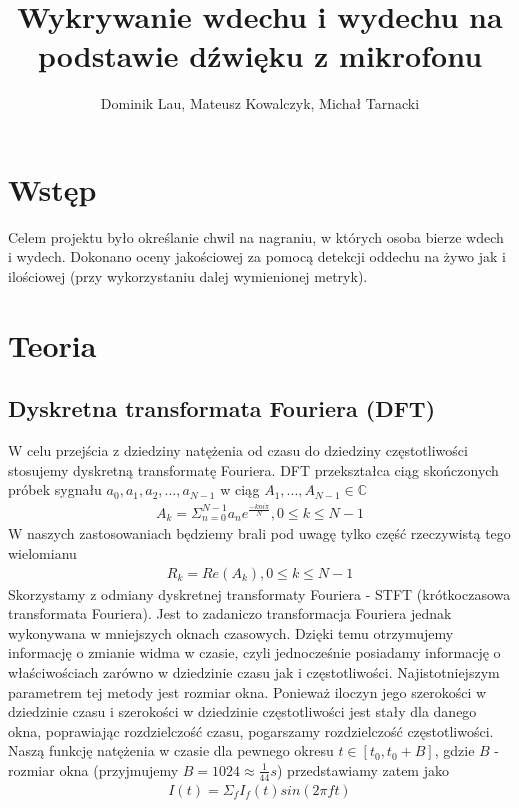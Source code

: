\documentclass[polish]{article}
\title{Wykrywanie wdechu i wydechu na podstawie dźwięku z mikrofonu}
\author{Dominik Lau, Mateusz Kowalczyk, Michał Tarnacki}
\begin{document}
\maketitle

\section{Wstęp}
Celem projektu było określanie chwil na nagraniu, w których osoba bierze wdech i wydech. 
Dokonano oceny jakościowej za pomocą detekcji oddechu na żywo jak i ilościowej (przy wykorzystaniu
dalej wymienionej metryk).

\section{Teoria}
\subsection{Dyskretna transformata Fouriera (DFT)}
W celu przejścia z dziedziny natężenia od czasu do dziedziny częstotliwości stosujemy dyskretną transformatę
Fouriera.  DFT przekształca ciąg skończonych próbek sygnału $a_0, a_1, a_2, ..., a_{N-1}$ w ciąg 
$A_1, ..., A_{N-1} \in \mathbb{C}$
\begin{gather*}
	A_k = \Sigma_{n=0}^{N-1} a_ne^{\frac{-kni\pi}{N}}, 0 \le k \le N-1
\end{gather*}
W naszych zastosowaniach będziemy brali pod uwagę tylko część rzeczywistą tego wielomianu
\begin{gather*}
	R_k = Re(A_k), 0 \le k \le N-1
\end{gather*}
Skorzystamy z odmiany dyskretnej transformaty Fouriera - STFT (krótkoczasowa transformata Fouriera). 
Jest to zadaniczo transformacja Fouriera jednak wykonywana w mniejszych oknach czasowych. Dzięki temu otrzymujemy informację o zmianie widma w czasie, czyli jednocześnie posiadamy informację o właściwościach zarówno w dziedzinie czasu jak i częstotliwości. Najistotniejszym parametrem tej metody jest rozmiar okna. Ponieważ iloczyn jego szerokości w dziedzinie czasu i szerokości w dziedzinie częstotliwości jest stały dla danego okna, poprawiając rozdzielczość czasu, pogarszamy rozdzielczość częstotliwości.
Naszą funkcję natężenia w czasie dla pewnego okresu $t \in [t_0, t_0 + B]$, gdzie $B$ - rozmiar okna (przyjmujemy $B=1024\approx \frac{1}{44} s$) przedstawiamy zatem jako 
\begin{gather*}
	I(t) = \Sigma_{f} I_{f}(t)sin(2 \pi f t)
\end{gather*}
\end{document}
